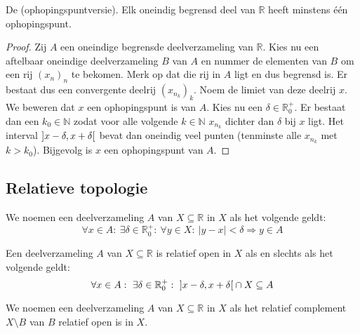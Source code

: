 \documentclass[main.tex]{subfiles}
\begin{document}
\begin{st}
  De  (ophopingspuntversie).
  Elk oneindig begrensd deel van $\mathbb{R}$ heeft minstens \'e\'en ophopingspunt.

  \begin{proof}
    Zij $A$ een oneindige begrensde deelverzameling van $\mathbb{R}$.
    Kies nu een aftelbaar oneindige deelverzameling $B$ van $A$ en nummer de elementen van $B$ om een rij $(x_{n})_{n}$ te bekomen.
    Merk op dat die rij in $A$ ligt en dus begrensd is.
    Er bestaat dus een convergente deelrij $(x_{n_{k}})_{k}$.
    Noem de limiet van deze deelrij $x$.
    We beweren dat $x$ een ophopingspunt is van $A$.
    Kies nu een $\delta \in \mathbb{R}_{0}^{+}$.
    Er bestaat dan een $k_{0}\in\mathbb{N}$ zodat voor alle volgende $k\in \mathbb{N}$ $x_{n_{k}}$ dichter dan $\delta$ bij $x$ ligt.
    Het interval $\interval[open]{x-\delta}{x+\delta}$ bevat dan oneindig veel punten (tenminste alle $x_{n_{k}}$ met $k>k_{0}$).
    Bijgevolg is $x$ een ophopingspunt van $A$.
  \end{proof}
\end{st}

\subsection{Relatieve topologie}
\label{sec:relatieve-topologie}

\begin{de}
  We noemen een deelverzameling $A$ van $X\subseteq \mathbb{R}$  in $X$ als het volgende geldt:
  \[ \forall x\in A:\ \exists \delta \in \mathbb{R}_{0}^{+}:\ \forall y\in X:\ |y-x| < \delta \Rightarrow y \in A \]
\end{de}

\begin{st}
  Een  deelverzameling $A$ van $X\subseteq \mathbb{R}$  is relatief open in $X$ als en slechts als het volgende geldt:
  \[ \forall x\in A:\ \exists \delta\in \mathbb{R}_{0}^{+}:\ \interval[open]{x-\delta}{x+\delta} \cap X \subseteq A \]
\end{st}

\begin{de}
  We noemen een deelverzameling $A$ van $X\subseteq \mathbb{R}$  in $X$ als het relatief complement $X\setminus B$ van $B$ relatief open is in $X$.
\end{de}
\end{document}
